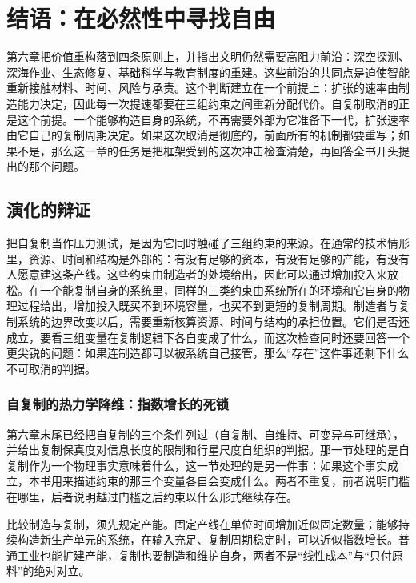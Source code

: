 \chapter{结语：在必然性中寻找自由}

第六章把价值重构落到四条原则上，并指出文明仍然需要高阻力前沿：深空探测、深海作业、生态修复、基础科学与教育制度的重建。这些前沿的共同点是迫使智能重新接触材料、时间、风险与承责。这个判断建立在一个前提上：扩张的速率由制造能力决定，因此每一次提速都要在三组约束之间重新分配代价。自复制取消的正是这个前提。一个能够构造自身的系统，不再需要外部为它准备下一代，扩张速率由它自己的复制周期决定。如果这次取消是彻底的，前面所有的机制都要重写；如果不是，那么这一章的任务是把框架受到的这次冲击检查清楚，再回答全书开头提出的那个问题。

\section{演化的辩证}

把自复制当作压力测试，是因为它同时触碰了三组约束的来源。在通常的技术情形里，资源、时间和结构是外部的：有没有足够的资本，有没有足够的产能，有没有人愿意建这条产线。这些约束由制造者的处境给出，因此可以通过增加投入来放松。在一个能复制自身的系统里，同样的三类约束由系统所在的环境和它自身的物理过程给出，增加投入既买不到环境容量，也买不到更短的复制周期。制造者与复制系统的边界改变以后，需要重新核算资源、时间与结构的承担位置。它们是否还成立，要看三组变量在复制逻辑下各自变成了什么，而这次检查同时还要回答一个更尖锐的问题：如果连制造都可以被系统自己接管，那么“存在”这件事还剩下什么不可取消的判据。

\subsection{自复制的热力学降维：指数增长的死锁}


第六章末尾已经把自复制的三个条件列过（自复制、自维持、可变异与可继承），并给出复制保真度对信息长度的限制和行星尺度自组织的判据。那一节处理的是自复制作为一个物理事实意味着什么，这一节处理的是另一件事：如果这个事实成立，本书用来描述约束的那三个变量各自会变成什么。两者不重复，前者说明门槛在哪里，后者说明越过门槛之后约束以什么形式继续存在。

比较制造与复制，须先规定产能。固定产线在单位时间增加近似固定数量；能够持续构造新生产单元的系统，在输入充足、复制周期稳定时，可以近似指数增长。普通工业也能扩建产能，复制也要制造和维护自身，两者不是“线性成本”与“只付原料”的绝对对立。

